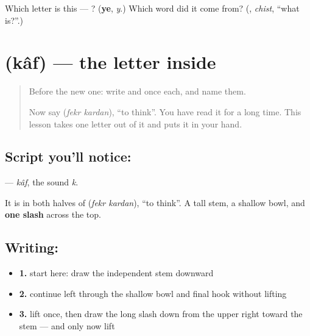 \begin{tcolorbox}[breakable,colback=teal!4,colframe=teal!35!black,title={Before you move on}]
Which letter is this — ? (\textbf{ye}, \emph{y}.) Which word did it come from? (\textbf{}, \emph{chist}, \textquotedblleft{}what is?\textquotedblright{}.)
\end{tcolorbox}
\section[\texorpdfstring{\fa{ک} (kâf)}{ک (kâf)}]{ (kâf) — the letter inside  }

\label{lesson:FA-W24-kaf}



\begin{quote}
Before the new one: write  and  once each, and name them.

Now say \textbf{ } (\emph{fekr kardan}), \textquotedblleft{}to think\textquotedblright{}. You have read it for a long time. This lesson takes one letter out of it and puts it in your hand.
\end{quote}

\subsection*{Script you'll notice: }
\textbf{} — \emph{kâf}, the sound \emph{k}.

It is in both halves of \textbf{ } (\emph{fekr kardan}), \textquotedblleft{}to think\textquotedblright{}. A tall stem, a shallow bowl, and \textbf{one slash} across the top.

\subsection*{Writing: }

\begin{itemize}
\raggedright
  \item \textbf{1.} start here: draw the independent stem downward
  \item \textbf{2.} continue left through the shallow bowl and final hook without lifting
  \item \textbf{3.} lift once, then draw the long slash down from the upper right toward the stem — and only now lift
\end{itemize}

